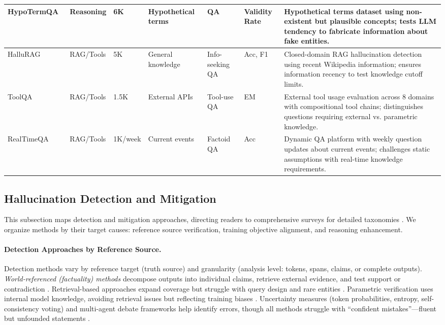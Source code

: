 \documentclass{llncs}
\begin{document}
\begin{table}[t]
{\begin{tabular}{l l l l l p{1.5cm} p{7cm}}
HypoTermQA~\cite{uluoglakci2024hypotermqa} & Reasoning & 6K & Hypothetical terms & QA & Validity Rate & Hypothetical terms dataset using non-existent but plausible concepts; tests LLM tendency to fabricate information about fake entities. \\
\hline
HalluRAG~\cite{ridder2025hallurag} & RAG/Tools & 5K & General knowledge & Info-seeking QA & Acc, F1 & Closed-domain RAG hallucination detection using recent Wikipedia information; ensures information recency to test knowledge cutoff limits. \\
ToolQA~\cite{zhuang2023toolqa} & RAG/Tools & 1.5K & External APIs & Tool-use QA & EM & External tool usage evaluation across 8 domains with compositional tool chains; distinguishes questions requiring external vs. parametric knowledge. \\
RealTimeQA~\cite{kasai2024realtimeqa} & RAG/Tools & 1K/week & Current events & Factoid QA & Acc & Dynamic QA platform with weekly question updates about current events; challenges static assumptions with real-time knowledge requirements. \\
\hline
\end{tabular}
}
\end{table}

\subsection{Hallucination Detection and Mitigation}

This subsection maps detection and mitigation approaches, directing readers to comprehensive surveys for detailed taxonomies \cite{huang2025survey,ji2023hallucination,zhang2023siren,bai2025hallucination}. We organize methods by their target causes: reference source verification, training objective alignment, and reasoning enhancement.

\paragraph{Detection Approaches by Reference Source.} 
Detection methods vary by reference target (truth source) and granularity (analysis level: tokens, spans, claims, or complete outputs). 
\textit{World-referenced (factuality) methods} decompose outputs into individual claims, retrieve external evidence, and test support or contradiction \cite{min2023factscore,chern2023factool}. Retrieval-based approaches expand coverage but struggle with query design and rare entities \cite{gao2023rarr}. Parametric verification uses internal model knowledge, avoiding retrieval issues but reflecting training biases \cite{azaria2023internal}. Uncertainty measures (token probabilities, entropy, self-consistency voting) and multi-agent debate frameworks help identify errors, though all methods struggle with ``confident mistakes''—fluent but unfounded statements \cite{manakul2023selfcheckgpt,wang2022self}.
\end{document}
